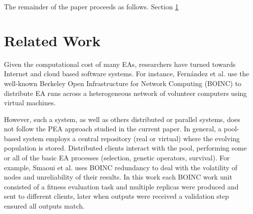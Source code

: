 \documentclass{sig-alternate}
\begin{document}
%

The remainder of the paper proceeds as follows. Section \ref{sec:work} 

\section{Related Work}
\label{sec:work}
Given the computational cost of many EAs, researchers have turned towards Internet and cloud based software systems.
For instance, Fern\'andez et al. \cite{nc}%
use the well-known Berkeley Open Infrastructure for Network Computing (BOINC) to distribute EA runs across a
heterogeneous network of volunteer computers using virtual machines.

However, such a system, as well as others distributed or parallel systems, does not follow the PEA approach studied in the current paper.
In general, a pool-based system employs a central repository (real or virtual) where the evolving population is stored.
Distributed clients interact with the pool, performing some or all of the basic EA processes (selection, genetic operators, survival). 
For example, Smaoui et al. \cite{FekiNG09} uses BOINC redundancy
to deal with the volatility of nodes and unreliability of their results. 
In this work each BOINC work unit consisted of a fitness evaluation task and
multiple replicas were produced and sent to different clients, later when 
outputs were received a validation step ensured all outputs match.
\end{document}
